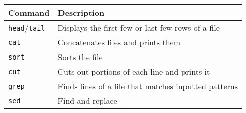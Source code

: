\documentclass[
]{book}
\begin{document}
\begin{longtable}[]{@{}ll@{}}
\toprule
\begin{minipage}[b]{0.41\columnwidth}\raggedright
Command\strut
\end{minipage} & \begin{minipage}[b]{0.53\columnwidth}\raggedright
Description\strut
\end{minipage}\tabularnewline
\midrule
\endhead
\begin{minipage}[t]{0.41\columnwidth}\raggedright
\texttt{head}/\texttt{tail}\strut
\end{minipage} & \begin{minipage}[t]{0.53\columnwidth}\raggedright
Displays the first few or last few rows of a file\strut
\end{minipage}\tabularnewline
\begin{minipage}[t]{0.41\columnwidth}\raggedright
\texttt{cat}\strut
\end{minipage} & \begin{minipage}[t]{0.53\columnwidth}\raggedright
Concatenates files and prints them\strut
\end{minipage}\tabularnewline
\begin{minipage}[t]{0.41\columnwidth}\raggedright
\texttt{sort}\strut
\end{minipage} & \begin{minipage}[t]{0.53\columnwidth}\raggedright
Sorts the file\strut
\end{minipage}\tabularnewline
\begin{minipage}[t]{0.41\columnwidth}\raggedright
\texttt{cut}\strut
\end{minipage} & \begin{minipage}[t]{0.53\columnwidth}\raggedright
Cuts out portions of each line and prints it\strut
\end{minipage}\tabularnewline
\begin{minipage}[t]{0.41\columnwidth}\raggedright
\texttt{grep}\strut
\end{minipage} & \begin{minipage}[t]{0.53\columnwidth}\raggedright
Finds lines of a file that matches inputted patterns\strut
\end{minipage}\tabularnewline
\begin{minipage}[t]{0.41\columnwidth}\raggedright
\texttt{sed}\strut
\end{minipage} & \begin{minipage}[t]{0.53\columnwidth}\raggedright
Find and replace\strut
\end{minipage}\tabularnewline

\end{longtable}
\end{document}
